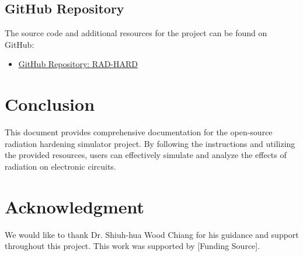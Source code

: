 \documentclass[12pt]{article}
\begin{document}
    \subsection{GitHub Repository}\label{subsec:github-repository}
    The source code and additional resources for the project can be found on GitHub:
    \begin{itemize}
        \item \href{https://github.com/Jacoba1100254352/RAD-HARD}{GitHub Repository: RAD-HARD}
    \end{itemize}


    \section{Conclusion}\label{sec:conclusion}
    This document provides comprehensive documentation for the open-source radiation hardening simulator project.
    By following the instructions and utilizing the provided resources, users can effectively simulate and analyze the effects of radiation on electronic circuits.

    \section*{Acknowledgment}
    We would like to thank Dr. Shiuh-hua Wood Chiang for his guidance and support throughout this project.
    This work was supported by [Funding Source].
\end{document}
